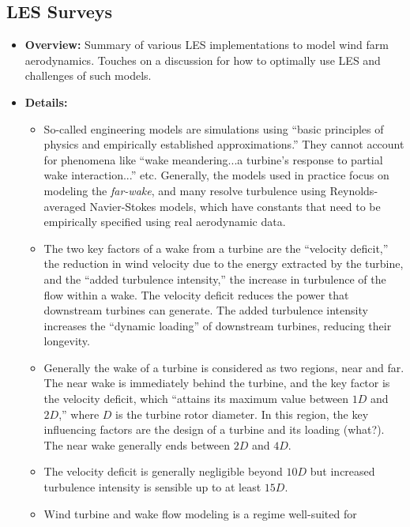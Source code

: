 \documentclass[12pt]{article}
\begin{document}
\subsection{LES Surveys}

\begin{itemize}
    \item \textbf{Overview:} Summary of various LES implementations to model
        wind farm aerodynamics. Touches on a discussion for how to optimally use LES
        and challenges of such models.
    \item \textbf{Details:} 
    \begin{itemize}
        \item So-called engineering models are simulations using ``basic
            principles of physics and empirically established approximations.''
            They cannot account for phenomena like ``wake meandering...a
            turbine's response to partial wake interaction...'' etc. Generally, the models
            used in practice focus on modeling the \emph{far-wake}, and many resolve turbulence
            using Reynolds-averaged Navier-Stokes models, which have constants that need
            to be empirically specified using real aerodynamic data.
        \item The two key factors of a wake from a turbine are the ``velocity deficit,''
            the reduction in wind velocity due to the energy extracted by the turbine,
            and the ``added turbulence intensity,'' the increase in turbulence
            of the flow within a wake. The velocity deficit reduces the power that downstream
            turbines can generate. The added turbulence intensity increases the ``dynamic loading''
            of downstream turbines, reducing their longevity.
        \item Generally the wake of a turbine is considered as two regions, near and far.
            The near wake is immediately behind the turbine, and the key factor is the
            velocity deficit, which ``attains its maximum value between $1D$ and $2D$,''
            where $D$ is the turbine rotor diameter. In this region, the key
            influencing factors are the design of a turbine and its loading (what?).
            The near wake generally ends between $2D$ and $4D$.
        \item The velocity deficit is generally negligible beyond $10D$ but increased turbulence
            intensity is sensible up to at least $15D$.
        \item Wind turbine and wake flow modeling is a regime well-suited for

\end{itemize}
\end{itemize}
\end{document}
